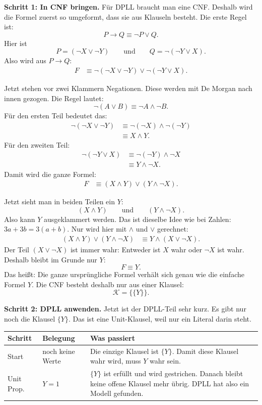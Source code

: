 \documentclass[a4paper,12pt]{article}
\begin{document}
\medskip
\textbf{Schritt 1: In CNF bringen.}
F\"ur DPLL braucht man eine CNF. Deshalb wird die Formel zuerst so
umgeformt, dass sie aus Klauseln besteht. Die erste Regel ist:
\[
P \to Q \equiv \neg P \vee Q.
\]
Hier ist
\[
P=(\neg X \vee \neg Y)
\qquad\text{und}\qquad
Q=\neg(\neg Y \vee X).
\]
Also wird aus $P \to Q$:
\begin{align*}
F
&\equiv \neg(\neg X \vee \neg Y) \vee \neg(\neg Y \vee X).
\end{align*}

\smallskip
Jetzt stehen vor zwei Klammern Negationen. Diese werden mit De Morgan
nach innen gezogen. Die Regel lautet:
\[
\neg(A \vee B) \equiv \neg A \wedge \neg B.
\]
F\"ur den ersten Teil bedeutet das:
\begin{align*}
\neg(\neg X \vee \neg Y)
&\equiv \neg(\neg X) \wedge \neg(\neg Y)\\
&\equiv X \wedge Y.
\end{align*}
F\"ur den zweiten Teil:
\begin{align*}
\neg(\neg Y \vee X)
&\equiv \neg(\neg Y) \wedge \neg X\\
&\equiv Y \wedge \neg X.
\end{align*}
Damit wird die ganze Formel:
\begin{align*}
F
&\equiv (X \wedge Y) \vee (Y \wedge \neg X).
\end{align*}

\smallskip
Jetzt sieht man in beiden Teilen ein $Y$:
\[
(X \wedge Y)
\qquad\text{und}\qquad
(Y \wedge \neg X).
\]
Also kann $Y$ ausgeklammert werden. Das ist dieselbe Idee wie bei
Zahlen: $3a + 3b = 3(a+b)$. Nur wird hier mit $\wedge$ und $\vee$
gerechnet:
\begin{align*}
(X \wedge Y) \vee (Y \wedge \neg X)
&\equiv Y \wedge (X \vee \neg X).
\end{align*}
Der Teil $(X \vee \neg X)$ ist immer wahr: Entweder ist $X$ wahr oder
$\neg X$ ist wahr. Deshalb bleibt im Grunde nur $Y$:
\[
F \equiv Y.
\]
Das hei\ss t: Die ganze urspr\"ungliche Formel verh\"alt sich genau wie
die einfache Formel $Y$. Die CNF besteht deshalb nur aus einer Klausel:
\[
\mathcal{K} = \bigl\{\{Y\}\bigr\}.
\]

\medskip
\textbf{Schritt 2: DPLL anwenden.}
Jetzt ist der DPLL-Teil sehr kurz. Es gibt nur noch die Klausel $\{Y\}$.
Das ist eine Unit-Klausel, weil nur ein Literal darin steht.

\begin{center}
\small
\renewcommand{\arraystretch}{1.25}
\begin{tabular}{p{}p{}p{}}
\toprule
Schritt & Belegung & Was passiert \\
\midrule
Start
& noch keine Werte
& Die einzige Klausel ist $\{Y\}$. Damit diese Klausel wahr wird,
  muss $Y$ wahr sein. \\
\midrule
Unit Prop.
& $Y=1$
& $\{Y\}$ ist erf\"ullt und wird gestrichen. Danach bleibt keine
  offene Klausel mehr \"ubrig. DPLL hat also ein Modell gefunden. \\
\bottomrule
\end{tabular}
\end{center}
\end{document}
